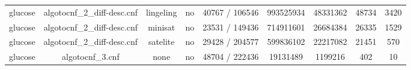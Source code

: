 \begin{appendices}
\begin{table}[p]
\begin{center}
\begin{tabular}{l|cccccccc}
  glucose                        & algotocnf\_2\_diff-desc.cnf    & lingeling  & no    & 40767 / 106546 & 993525934 & 48331362  & 48734      & 3420 \\ %
  glucose                        & algotocnf\_2\_diff-desc.cnf    & minisat    & no    & 23531 / 149436 & 714911601 & 26684384  & 26335      & 1529 \\ %
  glucose                        & algotocnf\_2\_diff-desc.cnf    & satelite   & no    & 29428 / 204577 & 599836102 & 22217082  & 21451      & 570 \\ %
  glucose                        & algotocnf\_3.cnf               & none       & no    & 48704 / 222436 & 19131489  & 1199216   & 402        & 10 \\ %
    \end{tabular}
  \end{center}
\end{table}

\newpage


\end{appendices}
